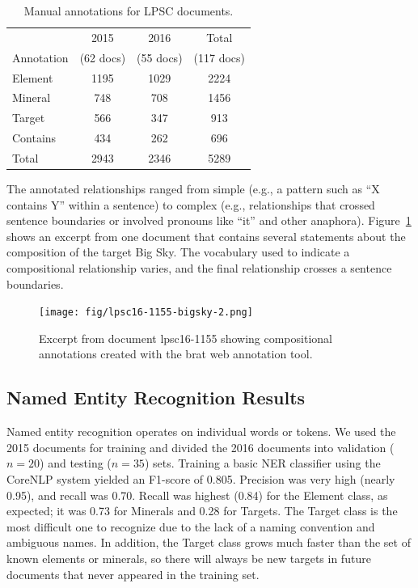 \documentclass[letterpaper]{article} %
\begin{document}
\begin{table}
\caption{Manual annotations for LPSC documents.}
\label{tab:docs}
\begin{center}
\begin{tabular}{l|ccc}
           & 2015     & 2016     & Total \\ 
Annotation & (62 docs) & (55 docs) & (117 docs)\\ \hline
Element  & 1195 & 1029 & 2224 \\
Mineral  & 748  & 708  & 1456 \\
Target   & 566  & 347  &  913 \\ \hline
Contains & 434  & 262  &  696 \\ \hline
Total    & 2943 & 2346 & 5289 \\ \hline
\end{tabular}
\end{center}
\end{table}

The annotated relationships ranged from simple (e.g., a pattern such
as ``X contains Y'' within a sentence) to complex (e.g., relationships
that crossed sentence boundaries or involved pronouns like ``it'' and
other anaphora).  Figure~\ref{fig:brat} shows an excerpt from one
document that contains several statements about the composition of the
target Big Sky.  The vocabulary used to indicate a compositional
relationship varies, and the final relationship crosses a sentence
boundaries.  

\begin{figure}
\begin{center}
\texttt{[image: fig/lpsc16-1155-bigsky-2.png]}
\end{center}
\caption{Excerpt from document lpsc16-1155 showing compositional
annotations created with the brat web annotation tool.}
\label{fig:brat}
\end{figure}


\subsection{Named Entity Recognition Results}

Named entity recognition operates on individual words or tokens.  We
used the 2015 documents for training and divided the 2016 documents
into validation ($n=20$) and testing ($n=35$) sets.  
Training a basic NER classifier using the CoreNLP system yielded an
F1-score of 0.805.  Precision was very high (nearly 0.95), and recall
was 0.70.  Recall was highest (0.84) for the Element class, as
expected; it was 0.73 for Minerals and 0.28 for Targets.  The Target
class is the most difficult one to recognize due to the lack of a
naming convention and ambiguous names.  In addition, the Target class
grows much faster than the set of known elements or minerals, so there
will always be new targets in future documents that never appeared in
the training set.
\end{document}
